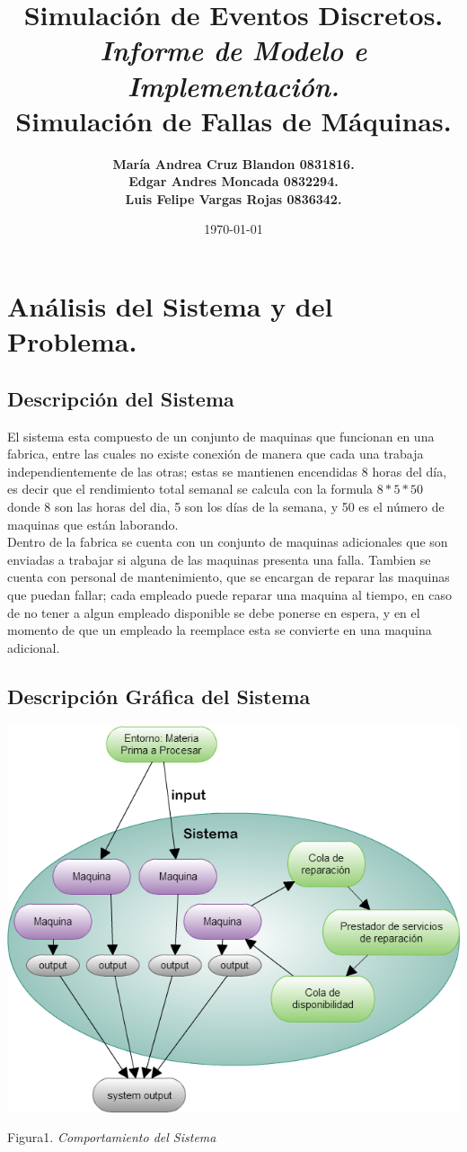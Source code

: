 \documentclass[10pt]{article}
\title{Simulación de Eventos Discretos.\\ \emph{Informe de Modelo e Implementación.} \\ \textbf{Simulación de Fallas de Máquinas.} }
\author{\textbf{María Andrea Cruz Blandon  0831816.} \\ \textbf{Edgar Andres Moncada 0832294.  }\\ \textbf{Luis Felipe Vargas Rojas 0836342. }}
\date{\today}
\begin{document}
\maketitle

\section{Análisis del Sistema y del Problema.}
\subsection{Descripción del Sistema}
El sistema esta compuesto de un conjunto de maquinas que funcionan en una fabrica, entre las cuales no existe conexión de manera que cada una trabaja independientemente de las otras; estas se mantienen encendidas 8 horas del día, es decir que el rendimiento total semanal se calcula con la formula $8*5*50$ donde 8 son las  horas del dia, 5 son los días de la  semana, y 50 es el número de maquinas que están laborando.\\

Dentro de la fabrica se cuenta con un conjunto de maquinas adicionales que son enviadas a trabajar si alguna de las maquinas presenta una falla. Tambien se cuenta con personal de mantenimiento, que se encargan de reparar las maquinas que puedan fallar; cada empleado puede reparar una maquina al tiempo, en caso de no tener a algun empleado disponible se debe ponerse en espera, y en el momento de que un empleado la reemplace esta se convierte en una maquina adicional.


\subsection{Descripción Gráfica del Sistema}
\begin{center}

\includegraphics[scale=0.47]{Simulacion.png}

Figura1. \emph{Comportamiento del Sistema}
\end{center}
\end{document}
